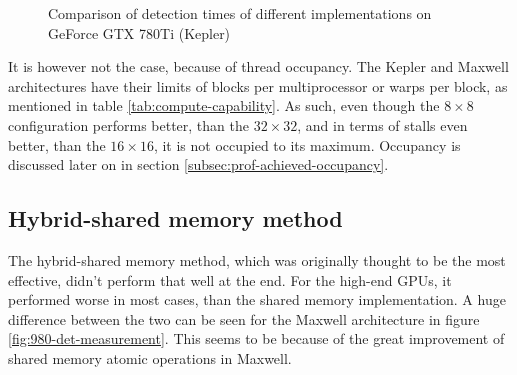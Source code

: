 \FloatBarrier

\begin{figure}[ht]
\centering{}
	\caption{Comparison of detection times of different implementations on GeForce GTX 780Ti (Kepler)}
	\label{fig:780ti-det-measurement}
\end{figure}

It is however not the case, because of thread occupancy. The Kepler and Maxwell architectures have their limits of blocks per multiprocessor or warps per block, as mentioned in table \ref{tab:compute-capability}. As such, even though the $8 \times 8$ configuration performs better, than the $32 \times 32$, and in terms of stalls even better, than the $16 \times 16$, it is not occupied to its maximum. Occupancy is discussed later on in section \ref{subsec:prof-achieved-occupancy}.

\subsection{Hybrid-shared memory method}

The hybrid-shared memory method, which was originally thought to be the most effective, didn't perform that well at the end. For the high-end GPUs, it performed worse in most cases, than the shared memory implementation. A huge difference between the two can be seen for the Maxwell architecture in figure \ref{fig:980-det-measurement}. This seems to be because of the great improvement of shared memory atomic operations in Maxwell.

